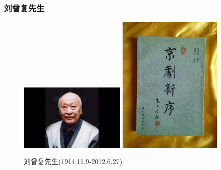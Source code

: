 \documentclass[cjk,slidestop,compress,mathserif,blue]{beamer}
\begin{document}
\frame
{
	\frametitle{刘曾复先生}
\begin{figure}[h!]
\centering
\vspace{-0.2in}
\includegraphics[height=0.64\textwidth,width=0.46\textwidth,viewport=0 0 360 520,clip]{Figures/Liu_Zengfu.jpg}
\hskip 5pt
\includegraphics[height=0.62\textwidth,width=0.45\textwidth,viewport=100 85 660 875,clip]{Figures/Liu_Xinxu.jpg}
\caption{刘曾复先生(1914.11.9-2012.6.27)}
\label{Liu_Zengfu}
\end{figure}
}
\end{document}
